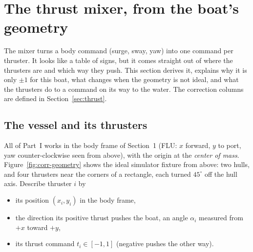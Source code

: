\section{The thrust mixer, from the boat's geometry}
\label{sec:mixer}

The mixer turns a body command (surge, sway, yaw) into one command per
thruster. It looks like a table of signs, but it comes straight out of where
the thrusters are and which way they push. This section derives it, explains
why it is only $\pm1$ for this boat, what changes when the geometry is not
ideal, and what the thrusters do to a command on its way to the water. The
correction columns are defined in Section~\ref{sec:thrust}.

\subsection{The vessel and its thrusters}

All of Part~I works in the body frame of Section~1 (FLU: $x$ forward, $y$ to
port, yaw counter-clockwise seen from above), with the origin at the
\emph{center of mass}. Figure~\ref{fig:corr-geometry} shows the ideal simulator fixture from
above: two hulls, and four thrusters near the corners of a rectangle, each
turned $45^\circ$ off the hull axis. Describe thruster $i$ by
\begin{itemize}[nosep]
  \item its position $(x_i, y_i)$ in the body frame,
  \item the direction its positive thrust pushes the boat, an angle $\alpha_i$
        measured from $+x$ toward $+y$,
  \item its thrust command $t_i\in[-1,1]$ (negative pushes the other way).
\end{itemize}

